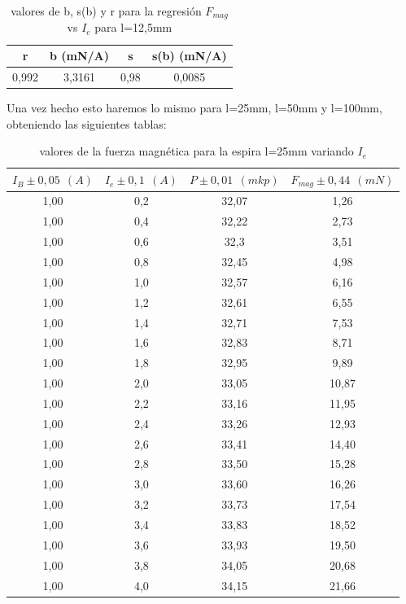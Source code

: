 \documentclass[12pt,a4paper]{book}
\begin{document}
\begin{table}[h!]
\begin{center}
\begin{tabular}{|c|c|c|c|}
\hline
r & 	 b  (mN/A) & 	 s & 	 s(b)  (mN/A) \\ \hline
0,992 & 	 3,3161 & 	 0,98 & 	 0,0085 \\
\hline
\end{tabular}
\end{center}
\caption{valores de b, s(b) y r para la regresión $F_{mag}$ vs $I_e$ para l=12,5mm}
\end{table}

Una vez hecho esto haremos lo mismo para l=25mm, l=50mm y l=100mm, obteniendo las siguientes tablas:

\newpage


\vspace*{3cm} 

\begin{table}[h!]
\begin{center}
\begin{tabular}{|c|c|c|c|}
\hline
$I_B  \pm 0,05 \ \  (A)$ & 	 $I_e \pm 0,1 \ \ (A) $ & 	 $P \pm 0,01\ \ (mkp)$ & 	 $F_{mag} \pm 0,44 \ \ (mN)$ \\ \hline
1,00 & 	 0,2 & 	 32,07 & 	 1,26 \\
1,00 & 	 0,4 & 	 32,22 & 	 2,73 \\
1,00 & 	 0,6 & 	 32,3 & 	 3,51 \\
1,00 & 	 0,8 & 	 32,45 & 	 4,98 \\
1,00 & 	 1,0 & 	 32,57 & 	 6,16 \\
1,00 & 	 1,2 & 	 32,61 & 	 6,55 \\
1,00 & 	 1,4 & 	 32,71 & 	 7,53 \\
1,00 & 	 1,6 & 	 32,83 & 	 8,71 \\
1,00 & 	 1,8 & 	 32,95 & 	 9,89 \\
1,00 & 	 2,0 & 	 33,05 & 	 10,87 \\
1,00 & 	 2,2 & 	 33,16 & 	 11,95 \\
1,00 & 	 2,4 & 	 33,26 & 	 12,93 \\
1,00 & 	 2,6 & 	 33,41 & 	 14,40 \\
1,00 & 	 2,8 & 	 33,50 & 	 15,28 \\
1,00 & 	 3,0 & 	 33,60 & 	 16,26 \\
1,00 & 	 3,2 & 	 33,73 & 	 17,54 \\
1,00 & 	 3,4 & 	 33,83 & 	 18,52 \\
1,00 & 	 3,6 & 	 33,93 & 	 19,50 \\
1,00 & 	 3,8 & 	 34,05 & 	 20,68 \\
1,00 & 	 4,0 & 	 34,15 & 	 21,66 \\
\hline
\end{tabular}
\end{center}
\caption{valores de la fuerza magnética para la espira l=25mm variando $I_e$}
\end{table}
\end{document}
